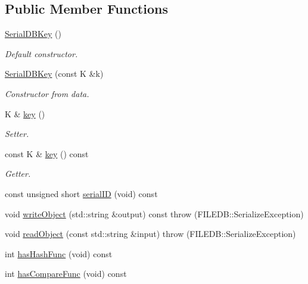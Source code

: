 \subsection*{Public Member Functions}
\begin{DoxyCompactItemize}
\item 
\mbox{\hyperlink{classADATIO_1_1SerialDBKey_acaf28250dcc8a2b3944f7edef046df05}{Serial\+D\+B\+Key}} ()
\begin{DoxyCompactList}\small\item\em Default constructor. \end{DoxyCompactList}\item 
\mbox{\hyperlink{classADATIO_1_1SerialDBKey_ad035f1ac5d8565aec4e5a7197333123f}{Serial\+D\+B\+Key}} (const K \&k)
\begin{DoxyCompactList}\small\item\em Constructor from data. \end{DoxyCompactList}\item 
K \& \mbox{\hyperlink{classADATIO_1_1SerialDBKey_a9dc566bd8bc83d98d4438d220012648a}{key}} ()
\begin{DoxyCompactList}\small\item\em Setter. \end{DoxyCompactList}\item 
const K \& \mbox{\hyperlink{classADATIO_1_1SerialDBKey_a89514c7decfe6ee0573032faff49703a}{key}} () const
\begin{DoxyCompactList}\small\item\em Getter. \end{DoxyCompactList}\item 
const unsigned short \mbox{\hyperlink{classADATIO_1_1SerialDBKey_a0d088e08f453fd38a906208783f788d7}{serial\+ID}} (void) const
\item 
void \mbox{\hyperlink{classADATIO_1_1SerialDBKey_a6e2d9bbd18a3fa5e049f0ad5321d328a}{write\+Object}} (std\+::string \&output) const  throw (\+F\+I\+L\+E\+D\+B\+::\+Serialize\+Exception)
\item 
void \mbox{\hyperlink{classADATIO_1_1SerialDBKey_a10b5c24f2529bac1df4c4603c2caf551}{read\+Object}} (const std\+::string \&input)  throw (\+F\+I\+L\+E\+D\+B\+::\+Serialize\+Exception)
\item 
int \mbox{\hyperlink{classADATIO_1_1SerialDBKey_ae8926cd9bdef006f3729f4b724a2e2fe}{has\+Hash\+Func}} (void) const
\item 
int \mbox{\hyperlink{classADATIO_1_1SerialDBKey_a2f28d2ac39919d9cb9f6fc097944c49c}{has\+Compare\+Func}} (void) const

\end{DoxyCompactItemize}
